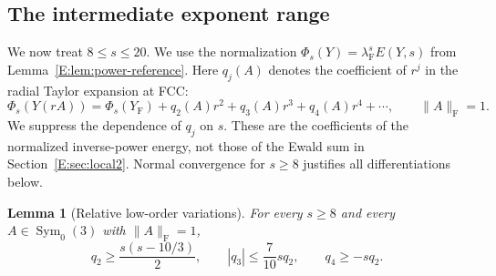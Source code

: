\documentclass[reqno,english]{amsart}
\newtheorem{lemma}[theorem]{Lemma}
\theoremstyle{definition}
\newtheorem{open problem}[theorem]{Open Problem}
\theoremstyle{remark}
\theoremstyle{plain}
\numberwithin{equation}{section}
\newcommand{\YF}{Y_{\mathrm F}}
\newcommand{\norm}[1]{\lVert#1\rVert_{\mathrm F}}
\newcommand{\lam}{\lambda_{\mathrm F}}
\newcommand{\Symzero}{\operatorname{Sym}_0(3)}
\begin{document}
\subsection{The intermediate exponent range}\label{E:sec:local8}
We now treat $8\le s\le20$. We use the normalization
$\Phi_s(Y)=\lam^sE(Y,s)$ from
Lemma~\ref{E:lem:power-reference}. Here $q_j(A)$ denotes the
coefficient of $r^j$ in the radial Taylor expansion at FCC:
\[
 \Phi_s(Y(rA))=\Phi_s(\YF)+q_2(A)r^2+q_3(A)r^3+q_4(A)r^4+\cdots,
 \qquad \norm A=1.
\]
We suppress the dependence of $q_j$ on $s$. These are the
coefficients of the normalized inverse-power energy, not those of
the Ewald sum in Section~\ref{E:sec:local2}. Normal convergence
for $s\ge8$ justifies all differentiations below.

\begin{lemma}[Relative low-order variations]\label{E:lem:relative-power}
For every $s\ge8$ and every $A\in\Symzero$ with $\norm A=1$,
\begin{equation}
 q_2\ge\frac{s(s-10/3)}2,\qquad
 |q_3|\le\frac7{10}s q_2,\qquad q_4\ge-sq_2.
 \label{E:eq:relative-power}
\end{equation}
\end{lemma}
\end{document}
